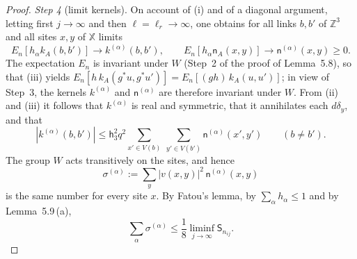 \documentclass[11pt,letterpaper,reqno]{amsart}
\theoremstyle{definition}
\begin{document}
\begin{proof}
\emph{Step 4} (limit kernels).
On account of (i) and of a diagonal argument, letting first $j\to\infty$ and then $\ell=\ell_r\to\infty$, one obtains for all links $b,b'$ of $\mathbb Z^3$ and all sites $x,y$ of $\mathbb X$ limits
\begin{equation*}
E_n[h_\alpha k_A(b,b')]\to k^{(\alpha)}(b,b'),\qquad E_n[h_\alpha\mathsf n_A(x,y)]\to\mathsf n^{(\alpha)}(x,y)\ge0.
\end{equation*}
The expectation $E_n$ is invariant under $W$ (Step~2 of the proof of Lemma~5.8), so that (iii) yields $E_n[h\,k_A(g^*u,g^*u')]=E_n[(gh)\,k_A(u,u')]$;
in view of Step~3, the kernels $k^{(\alpha)}$ and $\mathsf n^{(\alpha)}$ are therefore invariant under $W$.
From (ii) and (iii) it follows that $k^{(\alpha)}$ is real and symmetric, that it annihilates each $d\delta_y$, and that
\begin{equation*}
|k^{(\alpha)}(b,b')|\le\mathsf h_3^2q^2\sum_{x'\in V(b)}\ \sum_{y'\in V(b')}\mathsf n^{(\alpha)}(x',y')\qquad(b\ne b').
\end{equation*}
The group $W$ acts transitively on the sites, and hence
\begin{equation*}
\sigma^{(\alpha)}:=\sum_y|v(x,y)|^2\,\mathsf n^{(\alpha)}(x,y)
\end{equation*}
is the same number for every site $x$.
By Fatou's lemma, by $\sum_\alpha h_\alpha\le1$ and by Lemma~5.9\,(a),
\begin{equation*}
\sum_\alpha\sigma^{(\alpha)}\le\frac18\liminf_{j\to\infty}\mathsf S_{n_{ij}}.
\end{equation*}


\end{proof}
\end{document}
